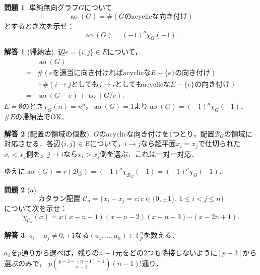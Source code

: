 \documentclass[xelatex,ja=standard,a4paper,14pt,everyparhook=compat]{bxjsarticle}
\DeclareMathOperator{\ao}{ao}
\newcommand{\bbF}{\mathbb{F}}
\newcommand{\mcB}{\mathcal{B}}
\newcommand{\mcC}{\mathcal{C}}
\theoremstyle{definition}
\newtheorem{problem}{問題}
\newtheorem*{answer}{解答}
\begin{document}
\begin{problem}
    単純無向グラフ$G$について \begin{equation*}
        \ao(G) = \#(\text{$G$のacyclicな向き付け})
    \end{equation*}
    とするとき次を示せ： \begin{equation*}
        \ao(G) = (-1)^p \chi_G(-1).
    \end{equation*}
\end{problem}
\begin{answer}[帰納法]
    辺$e = \{i,j\} \in E$について， \begin{align*}
        & \ao(G) \\
        ={}& \#(\text{$e$を適当に向き付ければacyclicな$E - \{e\}$の向き付け}) \\
        & + \#(\text{$i \to j$としても$j \to i$としてもacyclicな$E - \{e\}$の向き付け}) \\
        ={}& \ao(G-e) + \ao(G/e).
    \end{align*}
    $E = \emptyset$のとき$\chi_G(n) = n^p$，$\ao(G) = 1$より$\ao(G) = (-1)^p \chi_G(-1)$．$\#E$の帰納法でOK．
\end{answer}
\begin{answer}[配置の領域の個数]
    $G$のacyclicな向き付けを$1$つとり，配置$\mcB_G$の領域に対応させる．各辺$\{i,j\} \in E$について，$i \to j$なら超平面$x_i=x_j$で仕切られた$x_i < x_j$側を，$j \to i$なら$x_i > x_j$側を選ぶ．これは一対一対応．

    ゆえに$\ao(G) = r(\mcB_G) = (-1)^p \chi_{\mcB_G}(-1) = (-1)^p \chi_G(-1)$．
\end{answer}

\setcounter{problem}{114}
\begin{problem}[a]
    \begin{equation*}
        \text{カタラン配置 }\mcC_n = \{x_i - x_j = c : \text{$c \in \{0,\pm1\}$, $1 \leq i < j \leq n$}\}
    \end{equation*}
    について次を示せ： \begin{equation*}
        \chi_{\mcC_n}(x) = x(x-n-1)(x-n-2)(x-n-3)\cdots(x-2n+1).
    \end{equation*}
\end{problem}
\begin{answer}
    $a_i - a_j \neq 0, \pm1$なる$(a_1,\ldots,a_n) \in \bbF_p^n$を数える．

    $a_1$を$p$通りから選べば，残りの$n-1$元をどの$2$つも隣接しないように$[p-3]$から選ぶのみで， $p \binom{p-3-(n-1)+1}{n-1} (n-1)!$通り．
\end{answer}
\end{document}
